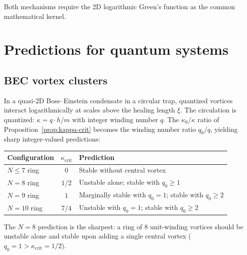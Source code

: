 \smallskip\noindent
Both mechanisms require the 2D logarithmic Green's function as the
common mathematical kernel.


\section{Predictions for quantum systems}
\label{sec:quantum}

\subsection{BEC vortex clusters}

In a quasi-2D Bose--Einstein condensate in a circular trap, quantized
vortices interact logarithmically at scales above the healing length
$\xi$.  The circulation is quantized:
$\kappa = q \cdot h/m$ with integer winding number $q$.
The $\kappa_0/\kappa$ ratio of Proposition~\ref{prop:kappa-crit}
becomes the winding number ratio $q_0/q$, yielding sharp integer-valued
predictions:

\begin{center}
\begin{tabular}{lcl}
\toprule
Configuration & $\kappa_{\mathrm{crit}}$ & Prediction \\
\midrule
$N \le 7$ ring & 0 & Stable without central vortex \\
$N = 8$ ring & $1/2$ & Unstable alone; stable with $q_0 \ge 1$ \\
$N = 9$ ring & $1$ & Marginally stable with $q_0 = 1$;
  stable with $q_0 \ge 2$ \\
$N = 10$ ring & $7/4$ & Unstable with $q_0 = 1$;
  stable with $q_0 \ge 2$ \\
\bottomrule
\end{tabular}
\end{center}

\noindent
The $N = 8$ prediction is the sharpest: a ring of $8$ unit-winding
vortices should be unstable alone and stable upon adding a single
central vortex ($q_0 = 1 > \kappa_{\mathrm{crit}} = 1/2$).

